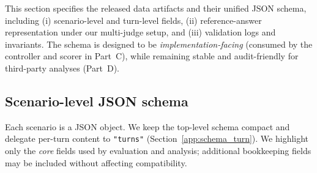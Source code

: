 This section specifies the released data artifacts and their unified JSON schema, including (i) scenario-level and turn-level fields, (ii) reference-answer representation under our multi-judge setup, and (iii) validation logs and invariants.
The schema is designed to be \emph{implementation-facing} (consumed by the controller and scorer in Part~C), while remaining stable and audit-friendly for third-party analyses (Part~D).

\subsection{Scenario-level JSON schema}
\label{app:schema_scenario}

Each scenario is a JSON object. We keep the top-level schema compact and delegate per-turn content to \texttt{"turns"} (Section~\ref{app:schema_turn}). We highlight only the \emph{core} fields used by evaluation and analysis; additional bookkeeping fields may be included without affecting compatibility.

